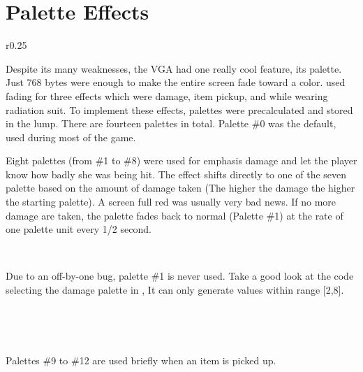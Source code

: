 \section{Palette Effects}
\label{label_palettes} \label{doom_palette}
\begin{wrapfigure}[8]{r}{0.25\textwidth}
\centering
{}
\end{wrapfigure}

Despite its many weaknesses, the VGA had one really cool feature, its palette. Just 768 bytes were enough to make the entire screen fade toward a color. \doom{} used fading for three effects which were damage, item pickup, and while wearing radiation suit. To implement these effects, palettes were precalculated and stored in the  lump. There are fourteen palettes in total. Palette \#0 was the default, used during most of the game.\\
\par
Eight palettes (from \#1 to \#8) were used for emphasis damage and let the player know how badly she was being hit. The effect shifts directly to one of the seven palette based on the amount of damage taken (The higher the damage the higher the starting palette). A screen full red was usually very bad news. If no more damage are taken, the palette fades back to normal (Palette \#1) at the rate of one palette unit every 1/2 second.\\
\par
{}
\\
\par
Due to an off-by-one bug, palette \#1 is never used. Take a good look at the code selecting the damage palette in , It can only generate values within range [2,8].\\
\par
{}\\
\par
{}\\
\par
Palettes \#9 to \#12 are used briefly when an item is picked up.\\
\par
{}
